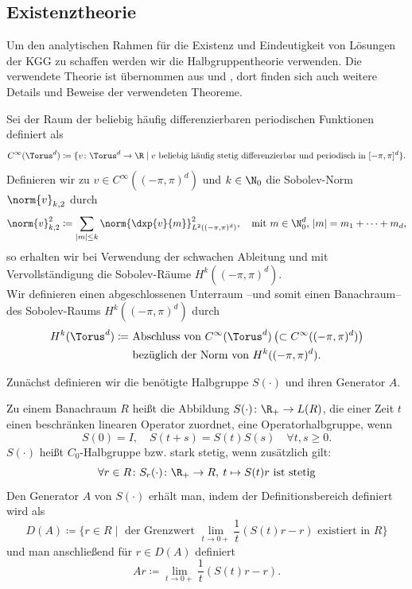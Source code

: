 \subsection{Existenztheorie}
\label{chapter:existencetheory}
Um den analytischen Rahmen für die Existenz und Eindeutigkeit von Lösungen der KGG zu schaffen werden wir die Halbgruppentheorie verwenden. Die verwendete Theorie ist übernommen aus \autocite{HundSchnau} und \autocite{EngelNagel}, dort finden sich auch weitere Details und Beweise der verwendeten Theoreme.
\begin{mathdef}
Sei der Raum der beliebig häufig differenzierbaren periodischen Funktionen definiert als
\[C^\infty (\Torus^d)\coloneqq \lbrace v\colon \Torus^d\to\R \mid v \text{ beliebig häufig stetig differenzierbar und periodisch in }[-\pi,\pi]^d\rbrace.\]
Definieren wir zu $v\in C^\infty((-\pi,\pi)^d)$ und $k\in\N_0$ die Sobolev-Norm $\norm{v}_{k,2}$ durch
\[\norm{v}_{k,2}^2\coloneqq \sum_{|m|\le k}\norm{\dxp{v}{m}}_{L^2((-\pi,\pi)^d)}^2,\quad \text{mit }m\in\N_0^d,\, |m|=m_1+\dots + m_d,\]
so erhalten wir bei Verwendung der schwachen Ableitung und mit Vervollständigung die Sobolev-Räume $H^k((-\pi,\pi)^d)$.\\
Wir definieren einen abgeschlossenen Unterraum --und somit einen Banachraum-- des Sobolev-Raums $H^k((-\pi,\pi)^d)$ durch
\begin{align*}H^k(\Torus^d)\coloneqq &\text{ Abschluss von } C^\infty(\Torus^d)\left(\subset C^\infty((-\pi,\pi)^d)\right)\\
&\text{ bezüglich der Norm von } H^k((-\pi,\pi)^d).
\end{align*}
\end{mathdef}
Zunächst definieren wir die benötigte Halbgruppe $S(\cdot)$ und ihren Generator $A$.
\begin{mathdef}
Zu einem Banachraum $R$ heißt die Abbildung $S(\cdot)\colon \R_+\to L(R)$, die einer Zeit $t$ einen beschränken linearen Operator zuordnet, eine Operatorhalbgruppe, wenn
\[S(0)=I,\quad S(t+s)=S(t)S(s)\quad \forall t,s\ge 0.\]
$S(\cdot)$ heißt $C_0$-Halbgruppe bzw. stark stetig, wenn zusätzlich gilt:
\[\forall r\in R\colon S_r(\cdot)\colon \R_+\to R,\: t\mapsto S(t)r \text{ ist stetig}\]
Den Generator $A$ von $S(\cdot)$ erhält man, indem der Definitionsbereich definiert wird als
\[D(A)\coloneqq \lbrace r\in R\mid \text{ der Grenzwert } \lim\limits_{t\to0+}\frac{1}{t}(S(t)r-r)\text { existiert in }R\rbrace\]
und man anschließend für $r\in D(A)$ definiert
\[Ar\coloneqq \lim\limits_{t\to0+}\frac{1}{t}(S(t)r-r).\]
\end{mathdef}
